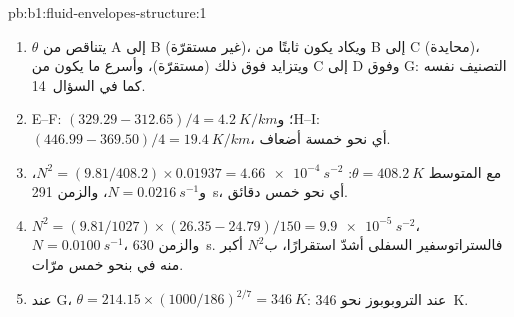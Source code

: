 \begin{solution}{pb:b1:fluid-envelopes-structure:1}
\begin{enumerate}
  \item $\theta$ يتناقص من A إلى B (غير مستقرّة)، ويكاد يكون ثابتًا من B إلى C (محايدة)، ويتزايد فوق ذلك (مستقرّة)، وأسرع ما يكون من C إلى D وفوق G: التصنيف نفسه كما في السؤال~14.
  \item E--F: $(329.29 - 312.65)/4 = \qty{4.2}{K/km}$؛ وH--I: $(446.99 -
        369.50)/4 = \qty{19.4}{K/km}$، أي نحو خمسة أضعاف.
  \item مع المتوسط $\theta = \qty{408.2}{K}$: $N^2 = (9.81/408.2) \times
        0.01937 = \qty{4.66e-4}{s^{-2}}$، و$N = \qty{0.0216}{s^{-1}}$، والزمن
        \qty{291}{s}، أي نحو خمس دقائق.
  \item $N^2 = (9.81/1027) \times (26.35 - 24.79)/150 = \qty{9.9e-5}{s^{-2}}$،
        $N = \qty{0.0100}{s^{-1}}$، والزمن \qty{630}{s}. فالستراتوسفير السفلى أشدّ استقرارًا، ب$N^2$ أكبر منه في  بنحو خمس مرّات.
  \item عند G، $\theta = 214.15 \times (1000/186)^{2/7} = \qty{346}{K}$:  عند التروبوبوز نحو \qty{346}{K}.
\end{enumerate}
\end{solution}
